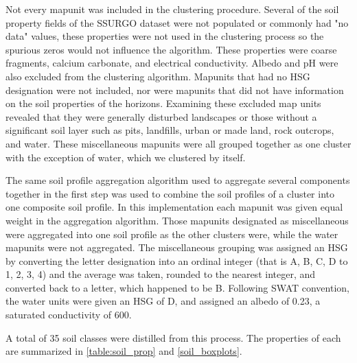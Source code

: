 Not every mapunit was included in the clustering procedure. Several of the soil property fields of the SSURGO dataset were not populated or commonly had "no data" values, these properties were not used in the
clustering process so the spurious zeros would not influence the algorithm. These properties were coarse fragments, calcium carbonate, and electrical conductivity. Albedo and pH were also excluded from the clustering algorithm. Mapunits that had no HSG designation were not included, nor were mapunits that did not have information on the soil properties of the horizons. Examining these excluded map units revealed that they were generally disturbed landscapes or those without a significant soil layer such as pits, landfills, urban or made land, rock outcrops, and water. These miscellaneous mapunits were all grouped together as one cluster with the exception of water, which we clustered by itself.

The same soil profile aggregation algorithm \citep{beaudette_algorithms_2013}
used to aggregate several components together in the first step was used to combine the soil profiles of a cluster into one
composite soil profile. In this implementation each mapunit was given equal
weight in the aggregation algorithm. Those mapunits designated as miscellaneous
were aggregated into one soil profile as the other clusters were, while the
water mapunits were not aggregated. The miscellaneous grouping was assigned an
HSG by converting the letter designation into an ordinal
integer (that is A, B, C, D to 1, 2, 3, 4) and the average was taken, rounded to
the nearest integer, and converted back to a letter, which happened to be B. Following SWAT convention, the water units
were given an HSG of D, and assigned an albedo of 0.23, a saturated conductivity
of 600.

A total of 35 soil classes were distilled from this process. The properties of each are summarized in \ref{table:soil_prop} and \ref{soil_boxplots}.



